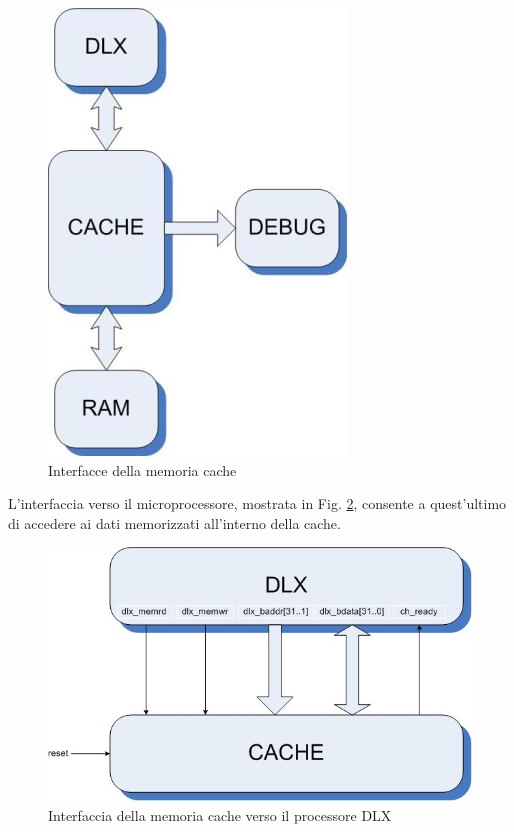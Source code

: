 \begin{figure}[h!]
\centering
\includegraphics{img/01-interfacce_schema_generale.jpg}
\caption{Interfacce della memoria cache}
\label{fig:int_gen}
\end{figure}


L'interfaccia verso il microprocessore, mostrata in Fig. \ref{fig:int_dlx}, consente a quest'ultimo di accedere ai dati memorizzati all'interno della cache. \\

\begin{figure}[h!]
\centering
\includegraphics[width=\textwidth]{img/dlx-cache.jpg}
\caption{Interfaccia della memoria cache verso il processore DLX}
\label{fig:int_dlx}
\end{figure}

